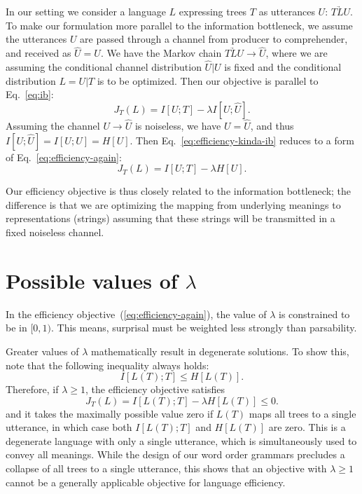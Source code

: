 \documentclass[12pt]{article}
\begin{document}
In our setting we consider a language $L$ expressing trees $T$ as utterances $U$: $T \underrightarrow{L} U$. To make our formulation more parallel to the information bottleneck, we assume the utterances $U$ are passed through a channel from producer to comprehender, and received as $\hat{U}=U$. We have the Markov chain $T \underrightarrow{L} U \rightarrow \hat{U}$, where we are assuming the conditional channel distribution $\hat{U}|U$ is fixed and the conditional distribution $L=U|T$ is to be optimized. Then our objective is parallel to Eq.~\ref{eq:ib}:
\begin{equation}
    \label{eq:efficiency-kinda-ib}
    J_T(L) = I[U;T] - \lambda I[U;\hat{U}]. %
\end{equation}
Assuming the channel $U \rightarrow \hat{U}$ is noiseless, we have $U=\hat{U}$, and thus $I[U;\hat{U}]=I[U;U] = H[U]$. Then Eq.~\ref{eq:efficiency-kinda-ib} reduces to a form of Eq.~\ref{eq:efficiency-again}:
\begin{equation*}
    J_T(L) = I[U;T] - \lambda H[U].
\end{equation*}

Our efficiency objective is thus closely related to the information bottleneck; the difference is that we are optimizing the mapping from underlying meanings to representations (strings) assuming that these strings will be transmitted in a fixed noiseless channel.

\section{Possible values of $\lambda$}

In the efficiency objective~(\ref{eq:efficiency-again}), the value of $\lambda$ is constrained to be in $[0,1)$.
This means, surprisal must be weighted less strongly than parsability.

Greater values of $\lambda$ mathematically result in degenerate solutions.
To show this, note that the following inequality always holds:
\begin{equation}
I[L(T); T] \leq H[L(T)].
\end{equation}
Therefore, if $\lambda \geq 1$, the efficiency objective satisfies 
\begin{equation}
    J_T(L) = I[L(T); T] - \lambda H[L(T)] \leq 0.
\end{equation}
and it takes the maximally possible value zero if $L(T)$ maps all trees to a single utterance, in which case both $I[L(T); T]$ and $H[L(T)]$ are zero.
This is a degenerate language with only a single utterance, which is simultaneously used to convey all meanings.
While the design of our word order grammars precludes a collapse of all trees to a single utterance, this shows that an objective with $\lambda \geq 1$ cannot be a generally applicable objective for language efficiency.
\end{document}
